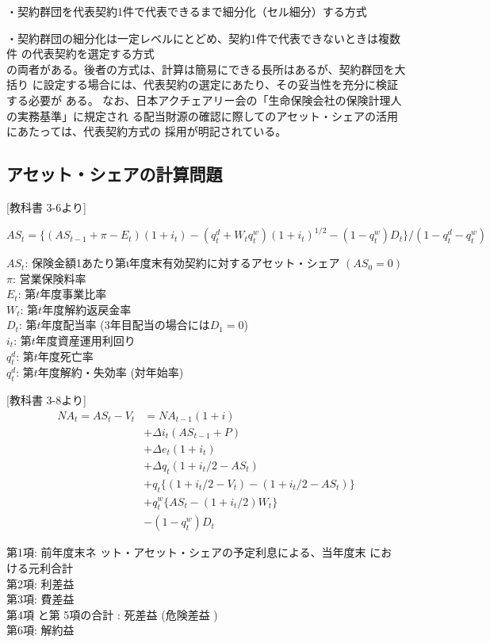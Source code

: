 \documentclass[report,gutter=10mm,fore-edge=10mm,uplatex,dvipdfmx]{jlreq}
\begin{document}
・契約群団を代表契約1件で代表できるまで細分化（セル細分）する方式

・契約群団の細分化は一定レベルにとどめ、契約1件で代表できないときは複数件
の代表契約を選定する方式\\
の両者がある。後者の方式は、計算は簡易にできる長所はあるが、契約群団を大括り
に設定する場合には、代表契約の選定にあたり、その妥当性を充分に検証する必要が
ある。
なお、日本アクチェアリー会の「生命保険会社の保険計理人の実務基準」に規定され
る配当財源の確認に際してのアセット・シェアの活用にあたっては、代表契約方式の
採用が明記されている。

\subsection{アセット・シェアの計算問題}

[教科書 3-6より]

$
AS_t=\{(AS_{t-1}+\pi - E_t)(1+i_t) - (q_t^d+W_tq_t^w)(1+i_t)^{1/2}-(1-q_t^w)D_t\}/(1-q_t^d-q_t^w)
$

\noindent
$AS_t$: 保険金額1あたり第ι年度末有効契約に対するアセット・シェア $(AS_0=0)$\\
$\pi$: 営業保険料率\\
$E_t$: 第$t$年度事業比率\\
$W_t$: 第$t$年度解約返戻金率\\
$D_t$: 第$t$年度配当率 (3年目配当の場合には$D_1=0$)\\
$i_t$: 第$t$年度資産運用利回り\\
$q_t^d$: 第$t$年度死亡率\\
$q_t^d$: 第$t$年度解約・失効率 (対年始率)


[教科書 3-8より]
\begin{equation*}
\begin{split}
NA_t =AS_t-V_t & =NA_{t-1}(1+i)\\
&+ \Delta i_t(AS_{t-1}+P)\\
&+ \Delta e_t(1+i_t)\\
&+ \Delta q_t(1+i_t/2 - AS_{t})\\
&+ q_t\{(1+i_t/2 -V_t) - (1+i_t/2 - AS_{t})\}\\
&+ q_t^w\{AS_{t} -(1+i_t/2)W_t\}\\&- (1-q_t^w)D_t
\end{split} 
\end{equation*}

第1項: 前年度末ネ ット・アセット・シェアの予定利息による、当年度末 にお ける元利合計\\
第2項: 利差益\\
第3項: 費差益\\
第4項 と第 5項の合計 : 死差益 (危険差益 )\\
第6項: 解約益 
\end{document}
